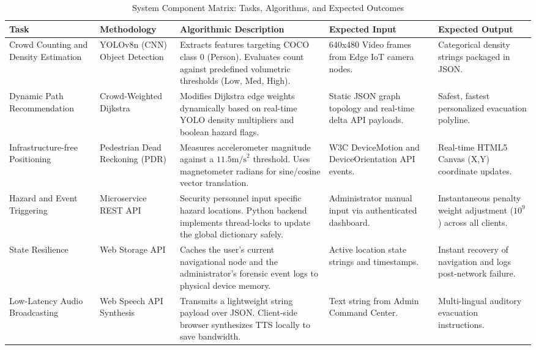 \documentclass[conference]{IEEEtran}
\begin{document}
\begin{table}[htbp]
\centering
\caption{System Component Matrix: Tasks, Algorithms, and Expected Outcomes}
\label{tab:framework_tasks}
\begin{tabularx}{\textwidth}{|>{\raggedright\arraybackslash}p{2.5cm}|>{\raggedright\arraybackslash}p{2.5cm}|X|>{\raggedright\arraybackslash}p{3cm}|>{\raggedright\arraybackslash}p{3cm}|}
\hline
\textbf{Task} & \textbf{Methodology} & \textbf{Algorithmic Description} & \textbf{Expected Input} & \textbf{Expected Output} \\ \hline
Crowd Counting and Density Estimation & YOLOv8n (CNN) Object Detection & Extracts features targeting
COCO class 0 (Person). Evaluates count against predefined volumetric thresholds (Low, Med, High). &
640x480 Video frames from Edge IoT camera nodes. & Categorical density strings packaged in JSON. \\
\hline
Dynamic Path Recommendation & Crowd-Weighted Dijkstra & Modifies Dijkstra edge weights dynamically
based on real-time YOLO density multipliers and boolean hazard flags. & Static JSON graph topology
and real-time delta API payloads. & Safest, fastest personalized evacuation polyline. \\ \hline
Infrastructure-free Positioning & Pedestrian Dead Reckoning (PDR) & Measures accelerometer magnitude
against a $11.5 \text{m/s}^2$ threshold. Uses magnetometer radians for sine/cosine vector
translation. & W3C DeviceMotion and DeviceOrientation API events. & Real-time HTML5 Canvas (X,Y)
coordinate updates. \\ \hline
Hazard and Event Triggering & Microservice REST API & Security personnel input specific hazard
locations. Python backend implements thread-locks to update the global dictionary safely. &
Administrator manual input via authenticated dashboard. & Instantaneous penalty weight adjustment
($10^9$) across all clients. \\ \hline
State Resilience & Web Storage API & Caches the user's current navigational node and the
administrator's forensic event logs to physical device memory. & Active location state strings and
timestamps. & Instant recovery of navigation and logs post-network failure. \\ \hline
Low-Latency Audio Broadcasting & Web Speech API Synthesis & Transmits a lightweight string payload
over JSON. Client-side browser synthesizes TTS locally to save bandwidth. & Text string from Admin
Command Center. & Multi-lingual auditory evacuation instructions. \\ \hline
\end{tabularx}
\end{table}
\end{document}

